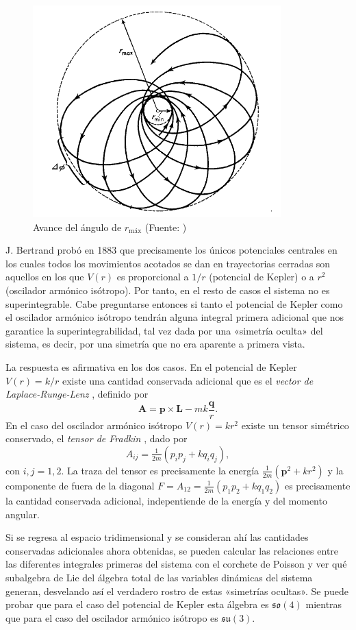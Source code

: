 \documentclass[12pt,a4paper,twoside]{article}
\theoremstyle{definition} \newtheorem{defn}[thm]{Definición}
\theoremstyle{definition} \newtheorem{ejemplo}[thm]{Ejemplo}
\theoremstyle{definition} \newtheorem{ejercicio}[thm]{Ejercicio}
\theoremstyle{remark} \newtheorem*{obs}{Observación}
\newcommand{\vect}[1]{\mathbf{#1}}
\begin{document}
\begin{figure}[h!]
  \centering
  \includegraphics[width=.4\textwidth]{bertrand}
  \caption{\small Avance del ángulo de $r_{\text{máx}}$ (Fuente: \cite{landau})}
  \label{fig:bertrand}
\end{figure}


J. Bertrand probó en 1883 \cite{bertrand} que precisamente los únicos potenciales centrales en los cuales todos los movimientos acotados se dan en trayectorias cerradas son aquellos en los que $V(r)$ es proporcional a $1/r$ (potencial de Kepler) o a $r^2$ (oscilador armónico isótropo). Por tanto, en el resto de casos el sistema no es superintegrable. Cabe preguntarse entonces si tanto el potencial de Kepler como el oscilador armónico isótropo tendrán alguna integral primera adicional que nos garantice la superintegrabilidad, tal vez dada por una «simetría oculta» del sistema, es decir, por una simetría que no era aparente a primera vista.

La respuesta es afirmativa en los dos casos. En el potencial de Kepler $V(r)=k/r$ existe una cantidad conservada adicional que es el \emph{vector de Laplace-Runge-Lenz} \cite{goldstein}, definido por
\begin{equation}
  \vect{A}=\vect{p}\times \vect{L}-mk\frac{\vect{q}}{r}. 
\end{equation}
En el caso del oscilador armónico isótropo $V(r)=kr^2$ existe un tensor simétrico conservado, el \emph{tensor de Fradkin} \cite{fradkin}, dado por
\begin{equation}
  A_{ij}=\tfrac{1}{2m}(p_ip_j+kq_iq_j), 
\end{equation}
con $i,j=1,2$. La traza del tensor es precisamente la energía $\tfrac{1}{2m}(\vect{p}^2+kr^2)$ y la componente de fuera de la diagonal $F=A_{12}=\tfrac{1}{2m}(p_1p_2+kq_1q_2)$ es precisamente la cantidad conservada adicional, indepentiende de la energía y del momento angular. 

Si se regresa al espacio tridimensional y se consideran ahí las cantidades conservadas adicionales ahora obtenidas, se pueden calcular las relaciones entre las diferentes integrales primeras del sistema con el corchete de Poisson y ver qué subalgebra de Lie del álgebra total de las variables dinámicas del sistema generan, desvelando así el verdadero rostro de estas «simetrías ocultas». Se puede probar que para el caso del potencial de Kepler esta álgebra es $\mathfrak{so}(4)$ mientras que para el caso del oscilador armónico isótropo es $\mathfrak{su}(3)$.
\end{document}
